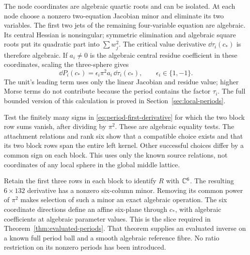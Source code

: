 The node coordinates are algebraic quartic roots and can be isolated.
At each node choose a nonzero two-equation Jacobian minor and
eliminate its two variables. The first two jets of the remaining
four-variable equation are algebraic. Its central Hessian is
nonsingular; symmetric elimination and algebraic square roots put
its quadratic part into $\sum w_j^2$. The critical value derivative
$\dd\tau_i(c_*)$ is therefore algebraic. If $a_i\ne0$ is the
algebraic central residue coefficient in these coordinates, scaling
the three-sphere gives
\begin{equation}\label{eq:period-first-derivative}
       \dd P_i(c_*)=\epsilon_i\pi^2a_i\,\dd\tau_i(c_*),
                   \qquad\epsilon_i\in\{1,-1\}.
\end{equation}
The unit's leading term uses only the linear Jacobian and residue
value; higher Morse terms do not contribute because the period
contains the factor $\tau_i$. The full bounded version of this
calculation is proved in Section~\ref{sec:local-periods}.

Test the finitely many signs in \eqref{eq:period-first-derivative}
for which the two block row sums vanish, after dividing by $\pi^2$.
These are algebraic equality tests. The attachment relations and
rank six show that a compatible choice exists and that its two
block rows span the entire left kernel. Other successful choices
differ by a common sign on each block. This uses only the known
source relations, not coordinates of any local sphere in the global
middle lattice.

Retain the first three rows in each block to identify $R$ with
$\mathbb C^6$. The resulting $6\times132$ derivative has a nonzero
six-column minor. Removing its common power of $\pi^2$ makes
selection of such a minor an exact algebraic operation. The six
coordinate directions define an affine six-plane through $c_*$,
with algebraic coefficients at algebraic parameter values. This is
the slice required in Theorem~\ref{thm:evaluated-periods}. That
theorem supplies an evaluated inverse on a known full period ball
and a smooth algebraic reference fibre. No ratio restriction on
its nonzero periods has been introduced.
